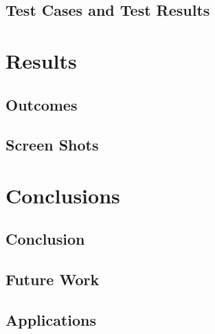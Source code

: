 \documentclass[oneside,a4paper,12pt]{report}
\begin{document}
\section{Test Cases and Test Results}

\chapter{Results}
\section{Outcomes}
\section{Screen Shots}


\chapter{Conclusions}
\section{Conclusion}
\section{Future Work}
\section{Applications}
\end{document}
